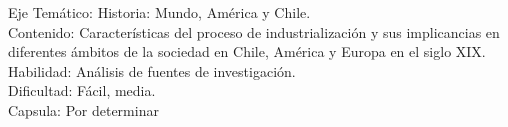 \documentclass[letterpaper,11pt]{article}
\newcommand{\anchopregunta}{0.9\textwidth}
\begin{document}
\begin{enumerate}
\begin{minipage}{\anchopregunta}
\begin{info} %
\begin{flushleft}
Eje Temático: Historia: Mundo, América y Chile.\\
Contenido: Características del proceso de industrialización y sus implicancias en diferentes ámbitos de la sociedad en Chile, América y Europa en el siglo XIX.\\
Habilidad: Análisis de fuentes de investigación.\\
Dificultad: Fácil, media.\\
Capsula: Por determinar \\
\end{flushleft} 
\end{info}
\end{minipage}\vfill$\;$ %


\end{enumerate}
\end{document}
